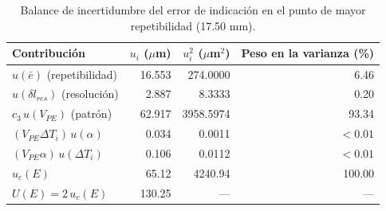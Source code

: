\begin{table}[H]
\centering
\caption{Balance de incertidumbre del error de indicación en el punto de mayor repetibilidad (17.50 mm).}
\label{tab:ut-balance}
\begin{tabular}{lrrr}
\toprule
Contribución & $u_i$ ($\mu$m) & $u_i^2$ ($\mu$m$^2$) & Peso en la varianza (\%) \\
\midrule
$u(\bar e)$ (repetibilidad) & 16.553 & 274.0000 & 6.46 \\
$u(\delta l_{res})$ (resolución) & 2.887 & 8.3333 & 0.20 \\
$c_3\,u(V_{PE})$ (patrón) & 62.917 & 3958.5974 & 93.34 \\
$(V_{PE}\Delta T_i)\,u(\alpha)$ & 0.034 & 0.0011 & $<0.01$ \\
$(V_{PE}\alpha)\,u(\Delta T_i)$ & 0.106 & 0.0112 & $<0.01$ \\
$u_c(E)$ & 65.12 & 4240.94 & 100.00 \\
$U(E) = 2\,u_c(E)$ & 130.25 & — & — \\
\bottomrule
\end{tabular}
\end{table}
